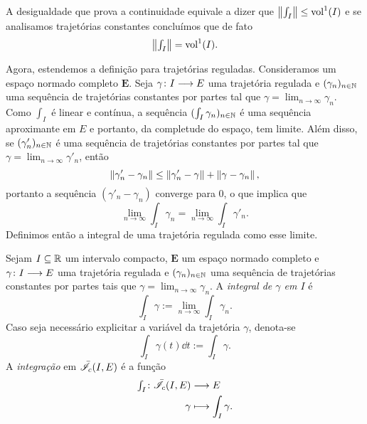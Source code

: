A desigualdade que prova a continuidade equivale a dizer que $\left\Vert{\textstyle\int_I}\right\Vert \leq \operatorname{vol}^1(I)$ e se analisamos trajetórias constantes concluímos que de fato
	\begin{equation*}
	\left\Vert{\textstyle\int_I}\right\Vert = \operatorname{vol}^1(I).
	\end{equation*}

Agora, estendemos a definição para trajetórias reguladas. Consideramos um espaço normado completo $\bm E$. Seja $\gamma\colon \allowbreak I \longrightarrow E$ uma trajetória regulada e $(\gamma_n)_{n \in \mathbb{N}}$ uma sequência de trajetórias constantes por partes tal que $\gamma = \lim_{n \to \infty} \gamma_n$. Como $\int_I$ é linear e contínua, a sequência $(\int_I \gamma_n)_{n \in \mathbb{N}}$ é uma sequência aproximante em $E$ e portanto, da completude do espaço, tem limite. Além disso, se $(\gamma'_n)_{n \in \mathbb{N}}$ é uma sequência de trajetórias constantes por partes tal que $\gamma = \lim_{n \to \infty} \gamma'_n$, então
	\begin{equation*}
	\left\Vert{\gamma'_n - \gamma_n}\right\Vert \leq \left\Vert{\gamma'_n - \gamma}\right\Vert + \left\Vert{\gamma - \gamma_n}\right\Vert,
	\end{equation*}
portanto a sequência $(\gamma'_n - \gamma_n)$ converge para $0$, o que implica que%
	\begin{equation*}
	\lim_{n \to \infty} \int_I \gamma_n = \lim_{n \to \infty} \int_I \gamma'_n.
	\end{equation*}
Definimos então a integral de uma trajetória regulada como esse limite.

\begin{definition}[Integração]
Sejam $I \subseteq \mathbb{R}$ um intervalo compacto, $\bm E$ um espaço normado completo e $\gamma\colon \allowbreak I \longrightarrow E$ uma trajetória regulada e $(\gamma_n)_{n \in \mathbb{N}}$ uma sequência de trajetórias constantes por partes tais que $\gamma = \lim_{n \to \infty} \gamma_n$.
A \emph{integral de $\gamma$ em $I$} é
	\begin{equation*}
	\int_I \gamma := \lim_{n \to \infty} \int_I \gamma_n.
	\end{equation*}
Caso seja necessário explicitar a variável da trajetória $\gamma$, denota-se
	\begin{equation*}
	\int_I \gamma(t) \dd t := \int_I \gamma.
	\end{equation*}
A \emph{integração} em $\bar{\mathscr{I}}_{c}(I,E)$ é a função
	\begin{align*}
	{\textstyle\int_I}\colon {\bar{\mathscr{I}}_{c}(I,E)} &\longrightarrow {E} \\{\gamma} &\longmapsto \int_I \gamma.
	\end{align*}
\end{definition}

